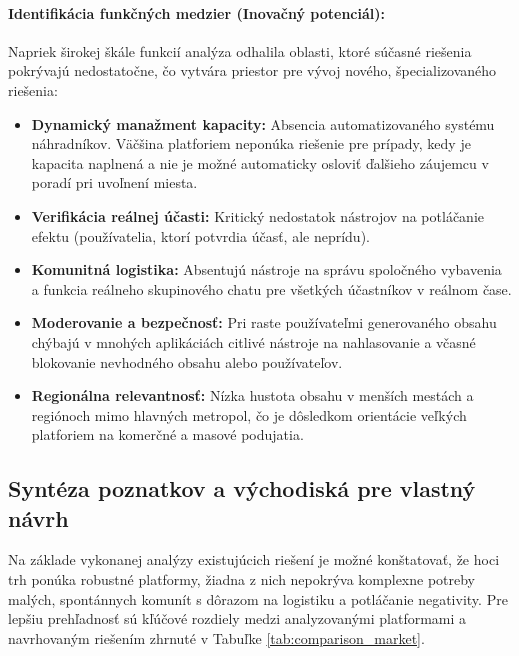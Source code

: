 \paragraph{Identifikácia funkčných medzier (Inovačný potenciál):}
Napriek širokej škále funkcií analýza odhalila oblasti, ktoré súčasné riešenia pokrývajú nedostatočne, 
čo vytvára priestor pre vývoj nového, špecializovaného riešenia:

\begin{itemize}[noitemsep]
    \item \textbf{Dynamický manažment kapacity:} Absencia automatizovaného systému náhradníkov. Väčšina platforiem neponúka riešenie pre prípady, kedy je kapacita naplnená a nie je možné automaticky osloviť ďalšieho záujemcu v poradí pri uvoľnení miesta.
    \item \textbf{Verifikácia reálnej účasti:} Kritický nedostatok nástrojov na potláčanie efektu (používatelia, ktorí potvrdia účasť, ale neprídu). 
    \item \textbf{Komunitná logistika:} Absentujú nástroje na správu spoločného vybavenia  a funkcia reálneho skupinového chatu pre všetkých účastníkov v reálnom čase.
    \item \textbf{Moderovanie a bezpečnosť:} Pri raste používateľmi generovaného obsahu chýbajú v mnohých aplikáciách citlivé 
    nástroje na nahlasovanie a včasné blokovanie nevhodného obsahu alebo používateľov.
    \item \textbf{Regionálna relevantnosť:} Nízka hustota obsahu v menších mestách a regiónoch mimo hlavných metropol, 
    čo je dôsledkom orientácie veľkých platforiem na komerčné a masové podujatia.
\end{itemize}

\subsection{Syntéza poznatkov a východiská pre vlastný návrh}
Na základe vykonanej analýzy existujúcich riešení je možné konštatovať, že hoci trh ponúka robustné platformy, 
žiadna z nich nepokrýva komplexne potreby malých, spontánnych komunít s dôrazom na logistiku a potláčanie negativity.
Pre lepšiu prehľadnosť sú kľúčové rozdiely medzi analyzovanými platformami a navrhovaným riešením zhrnuté v Tabuľke \ref{tab:comparison_market}.


